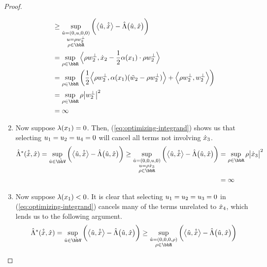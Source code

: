 \begin{proof}
\begin{enumerate}
\begin{align*}
        &\geq \sup_{\substack{\hat\momentVar=(0, \momentVar, 0, 0) \\ \momentVar = \rho w_2^\bot \\ \rho \in \bbR}} \bigg( \bprj{\hat\momentVar}{\hat\diffVar} - \hat\ode\big(\hat\momentVar, \hat\stateVar\big) \bigg) \\
        &= \sup_{\rho\in\bbR} \Bprj{\rho w_2^\bot}{\diffVar_2 - \frac12\affDiff(\stateVar_1) \cdot \rho w_2^\bot} \\
        &= \sup_{\rho\in\bbR} \bigg( \frac12\Bprj{\rho w_2^\bot}{\affDiff(\stateVar_1)(\tilde w_2 - \rho w_2^\bot)} + \Bprj{\rho w_2^\bot}{w_2^\bot} \bigg) \\
        &= \sup_{\rho\in\bbR} \rho \big|w_2^\bot\big|^2 \\
        &= \infty
      \end{align*}
    \item
      Now suppose $\lambda(x_1) = 0$.
      Then, (\ref{eq:optimizing-integrand}) shows us that selecting $u_1=u_2=u_4=0$ will cancel all terms not involving $\dot{x}_3$.
      \begin{align*}
        \hat\ode^*(\hat{\diffVar}, \hat\stateVar) 
        = \sup_{\hat\momentVar \in \hat\vecSpace} \bigg( \bprj{\hat\momentVar}{\hat\diffVar} - \hat\ode\big(\hat\momentVar, \hat\stateVar\big) \bigg) 
        \geq \sup_{\substack{\hat\momentVar=(0, 0, \momentVar, 0)  \\ \momentVar = \rho \diffVar_3 \\ \rho \in \bbR}} \bigg( \bprj{\hat\momentVar}{\hat\diffVar} - \hat\ode\big(\hat\momentVar, \hat\stateVar\big) \bigg) 
        &= \sup_{\rho\in\bbR} \rho\big|\diffVar_3\big|^2 \\
        &= \infty
      \end{align*}
    \item
      Now suppose $\lambda(x_1) < 0$.
      It is clear that selecting $u_1 = u_2 = u_3 = 0$ in (\ref{eq:optimizing-integrand}) cancels many of the terms unrelated to $\dot{x}_4$, which lends us to the following argument.
      \begin{align*}
        \hat\ode^*(\hat{\diffVar}, \hat\stateVar) 
        = \sup_{\hat\momentVar \in \hat\vecSpace} \bigg( \bprj{\hat\momentVar}{\hat\diffVar} - \hat\ode\big(\hat\momentVar, \hat\stateVar\big) \bigg) 
        &\geq \sup_{\substack{\hat\momentVar=(0, 0, 0, \rho)  \\ \rho \in \bbR}} \bigg( \bprj{\hat\momentVar}{\hat\diffVar} - \hat\ode\big(\hat\momentVar, \hat\stateVar\big) \bigg) \\

\end{align*}
\end{enumerate}
\end{proof}
